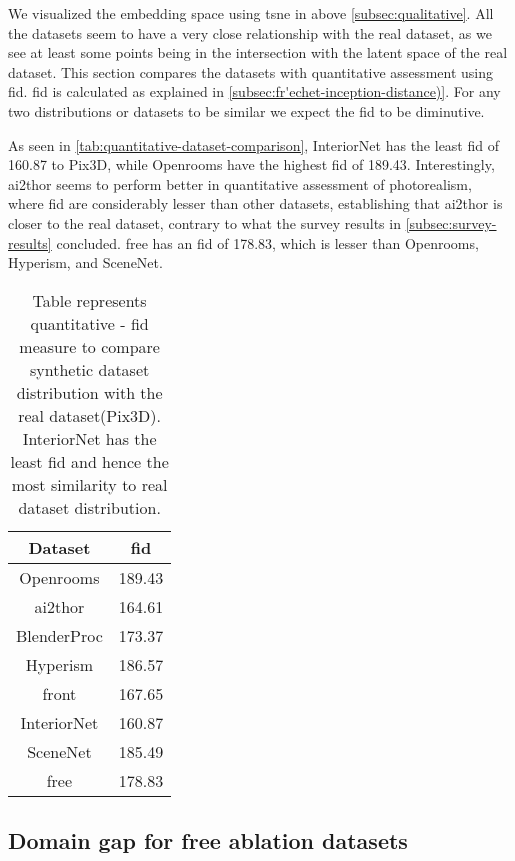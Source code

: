 We visualized the embedding space using \gls{tsne} in above \autoref{subsec:qualitative}.
All the datasets seem to have a very close relationship with the real dataset, as we see at least some points being in the intersection with the latent space of the real dataset.
This section compares the datasets with quantitative assessment using \gls{fid}.
\gls{fid} is calculated as explained in \autoref{subsec:fr'echet-inception-distance)}.
For any two distributions or datasets to be similar we expect the \gls{fid} to be diminutive.

As seen in \autoref{tab:quantitative-dataset-comparison}, InteriorNet has the least \gls{fid} of 160.87 to Pix3D, while Openrooms have the highest \gls{fid} of 189.43.
Interestingly, \gls{ai2thor} seems to perform better in quantitative assessment of photorealism,
where \gls{fid} are considerably lesser than other datasets,
establishing that \gls{ai2thor} is closer to the real dataset, contrary to what the survey results in \autoref{subsec:survey-results} concluded.
\gls{free} has an \gls{fid} of 178.83, which is lesser than Openrooms, Hyperism, and SceneNet.

\begin{table}[ht]
    \centering
    \begin{tabular}{|c |c |}
        \hline
        Dataset & \gls{fid} \\ [0.5ex]
        \hline\hline
        Openrooms & 189.43 \\
        \hline
        \gls{ai2thor} & 164.61 \\
        \hline
        BlenderProc  & 173.37 \\
        \hline
        Hyperism  & 186.57 \\
        \hline
        \gls{front}  & 167.65 \\
        \hline
        InteriorNet  & 160.87 \\
        \hline
        SceneNet & 185.49 \\
        \hline
        \gls{free} & 178.83 \\[1ex]
        \hline
    \end{tabular}
    \caption{Table represents quantitative - \gls{fid} measure to compare synthetic dataset distribution with the real dataset(Pix3D).
    InteriorNet has the least \gls{fid} and hence the most similarity to real dataset distribution.}
    \label{tab:quantitative-dataset-comparison}
\end{table}

\subsection{Domain gap for \gls{free} ablation datasets}


